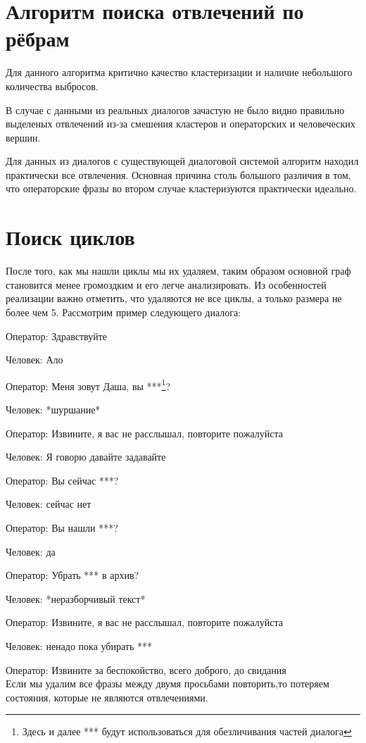 \documentclass[specification,annotation]{itmo-student-thesis}
\begin{document}
	\section{Алгоритм поиска отвлечений по рёбрам}
	Для данного алгоритма критично качество кластеризации и наличие небольшого количества выбросов. 
		
	В случае с данными из реальных диалогов зачастую не было видно правильно выделеных отвлечений из-за смешения кластеров и операторских и человеческих вершин.
		
	Для данных из диалогов с существующей диалоговой системой алгоритм находил практически все отвлечения. Основная причина столь большого различия в том, что операторские фразы во втором случае кластеризуются практически идеально.
	
	\section{Поиск циклов}
	После того, как мы нашли циклы мы их удаляем, таким образом основной граф становится менее громоздким и его легче анализировать. Из особенностей реализации важно отметить, что удаляются не все циклы, а только размера не более чем 5. Рассмотрим пример следующего диалога:
	
	Оператор: Здравствуйте
	
	Человек:  Ало
	
	Оператор:  Меня зовут Даша, вы ***\footnote{Здесь и далее *** будут использоваться для обезличивания частей диалога}?
	
	Человек:  *шуршание*
	
	Оператор:  Извините, я вас не расслышал, повторите пожалуйста
	
	Человек:  Я говорю давайте задавайте
	
	Оператор:  Вы сейчас ***?
	
	Человек:  сейчас нет
	
	Оператор:  Вы нашли ***?
	
	Человек:  да
	
	Оператор:  Убрать *** в архив?
	
	Человек:  *неразборчивый текст*
	
	Оператор:  Извините, я вас не расслышал, повторите пожалуйста
	
	Человек:  ненадо пока убирать ***
	
	Оператор:  Извините за беспокойство, всего доброго, до свидания\\
	
	Если мы удалим все фразы между двумя просьбами повторить,то потеряем состояния, которые не являются отвлечениями.
		
\end{document}

